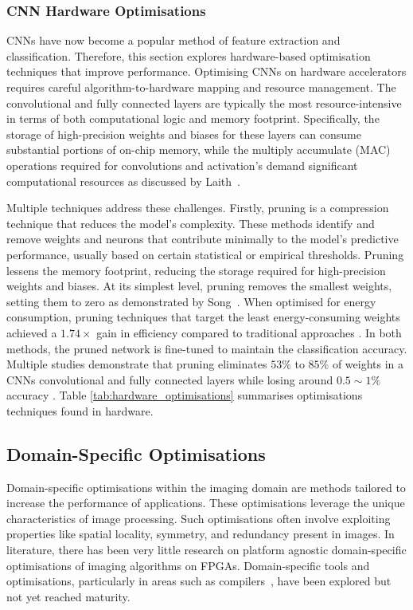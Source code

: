\subsubsection*{CNN Hardware Optimisations}
CNNs have now become a popular method of feature extraction and classification. Therefore, this section explores hardware-based optimisation techniques that improve performance. Optimising CNNs on hardware accelerators requires careful algorithm-to-hardware mapping and resource management. The convolutional and fully connected layers are typically the most resource-intensive in terms of both computational logic and memory footprint. Specifically, the storage of high-precision weights and biases for these layers can consume substantial portions of on-chip memory, while the multiply accumulate (MAC) operations required for convolutions and activation's demand significant computational resources as discussed by Laith~\etal\cite{LaiJinAmj21}.


Multiple techniques address these challenges. Firstly, pruning is a compression technique that reduces the model's complexity\cite{Ree93}. These methods identify and remove weights and neurons that contribute minimally to the model's predictive performance, usually based on certain statistical or empirical thresholds. Pruning lessens the memory footprint, reducing the storage required for high-precision weights and biases. At its simplest level, pruning removes the smallest weights, setting them to zero as demonstrated by Song~\etal\cite{han2016deep}. When optimised for energy consumption, pruning techniques that target the least energy-consuming weights achieved a $1.74\times$ gain in efficiency compared to traditional approaches \cite{yang2017designing}. In both methods, the pruned network is fine-tuned to maintain the classification accuracy. Multiple studies demonstrate that pruning eliminates $53\%$ to $85\%$ of weights in a CNNs convolutional and fully connected layers while losing around $0.5\sim1\%$ accuracy \cite{NIPS2015_ae0eb3ee,HeZhaSun17}. Table \ref{tab:hardware_optimisations} summarises optimisations techniques found in hardware.






\subsection*{Domain-Specific Optimisations}
Domain-specific optimisations within the imaging domain are methods tailored to increase the performance of applications. These optimisations leverage the unique characteristics of image processing. Such optimisations often involve exploiting properties like spatial locality, symmetry, and redundancy present in images. In literature, there has been very little research on platform agnostic domain-specific optimisations of imaging algorithms on FPGAs.  Domain-specific tools and optimisations, particularly in areas such as compilers~\cite{RaagBarCon13,TanChoRez11,ChrMehUdayBon21}, have been explored but not yet reached maturity.

